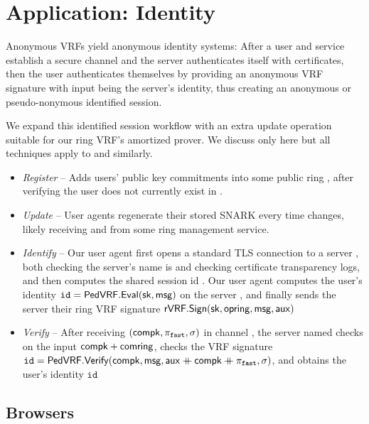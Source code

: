 \section{Application: Identity}
\label{sec:app_identity}

Anonymous VRFs yield anonymous identity systems:
After a user and service establish a secure channel and
the server authenticates itself with certificates, then
the user authenticates themselves by providing an anonymous
VRF signature with input \msg being the server's identity,
thus creating an anonymous or pseudo-nonymous identified session.

We expand this identified session workflow with an extra
update operation suitable for our ring VRF's amortized prover.
We discuss only \pifast here but all techniques apply to \pisk and \pipk similarly. 

\begin{itemize}
\item {\em Register} --
 Adds users' public key commitments into some public ring \ctx,
 after verifying the user does not currently exist in \ctx.
\item {\em Update} --
 User agents regenerate their stored SNARK \pifast every time \ctx changes,
 likely receiving \comring and \openring from some ring management service.
\item {\em Identify} --
 Our user agent first opens a standard TLS connection to a server \msg,
 both checking the server's name is \msg and checking certificate
 transparency logs, and then computes the shared session id \aux.
 Our user agent computes the user's identity
  $\mathtt{id} = {\mathsf{PedVRF}}.{\mathsf{Eval}}(\mathsf{sk},\mathsf{msg})$ on the server \msg,
 and finally sends the server their ring VRF signature
 ${\mathsf{rVRF}}.{\mathsf{Sign}}(\mathsf{sk},\mathsf{opring},\mathsf{msg},\mathsf{aux})$ %
\item {\em Verify} -- 
 After receiving $(\mathsf{compk},\pi_{\mathtt{fast}},\sigma)$ in channel \aux,
 the server named \msg checks \pifast on the input $\mathsf{compk} + \mathsf{comring}$,
 checks the VRF signature
 $\mathtt{id} = {\mathsf{PedVRF}}.{\mathsf{Verify}}(\mathsf{compk},\mathsf{msg},\mathsf{aux} \mathbin{+\mkern-10mu+} \mathsf{compk} \mathbin{+\mkern-10mu+} \pi_{\mathtt{fast}},\sigma)$,
 and obtains the user's identity $\mathtt{id}$
\end{itemize}


\subsection{Browsers}

